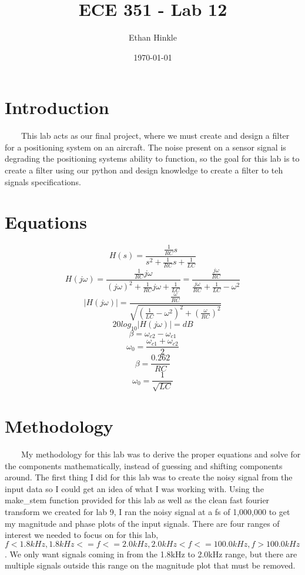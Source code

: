 \documentclass[11pt,a4]{article}
\title{ECE 351 - Lab 12}
\author{Ethan Hinkle}
\date{\today}
\begin{document}
\maketitle

\section{Introduction}

\ \ \ \ This lab acts as our final project, where we must create and design a filter for a positioning system on an aircraft. The noise present on a sensor signal is degrading the positioning systems ability to function, so the goal for this lab is to create a filter using our python and design knowledge to create a filter to teh signals specifications.

\section{Equations}

$$H(s) = \frac{\frac{1}{RC}s}{s^2+\frac{1}{RC}s+\frac{1}{LC}}$$
$$H(j\omega) = \frac{\frac{1}{RC}j\omega}{(j\omega)^2+\frac{1}{RC}j\omega+\frac{1}{LC}} = \frac{\frac{j\omega}{RC}}{\frac{j\omega}{RC}+\frac{1}{LC}-\omega^2}$$
$$|H(j\omega)| = \frac{\frac{\omega}{RC}}{\sqrt{(\frac{1}{LC}-\omega^2)^2+(\frac{\omega}{RC})^2}}$$
$$20log_{10}|H(j\omega)| = dB$$
$$\beta = \omega_{c2} - \omega_{c1}$$
$$\omega_0 = \frac{\omega_{c1} + \omega_{c2}}{2}$$
$$\beta = \frac{0.262}{RC}$$
$$\omega_0 = \frac{1}{\sqrt{LC}}$$

\section{Methodology}

\ \ \ \ My methodology for this lab was to derive the proper equations and solve for the components mathematically, instead of guessing and shifting components around. The first thing I did for this lab was to create the noisy signal from the input data so I could get an idea of what I was working with. Using the make\_stem function provided for this lab as well as the clean fast fourier transform we created for lab 9, I ran the noisy signal at a fs of 1,000,000 to get my magnitude and phase plots of the input signals. There are four ranges of interest we needed to focus on for this lab, $f < 1.8kHz, 1.8kHz <= f <= 2.0kHz, 2.0kHz < f <= 100.0kHz, f > 100.0kHz$. We only want signals coming in from the 1.8kHz to 2.0kHz range, but there are multiple signals outside this range on the magnitude plot that must be removed.
\end{document}

